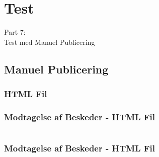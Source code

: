 \section{Test}
\begin{frame}
    \vspace{25mm}
    \begin{center}
        \Huge{Part 7:\\Test med Manuel Publicering}
    \end{center}
\end{frame}

\subsection{Manuel Publicering}
\subsubsection{HTML Fil}
\begin{frame}
    \frametitle{Modtagelse af Beskeder - HTML Fil}
    \vspace{-2mm}
    \inputminted[fontsize=\footnotesize,breaklines=true,highlightlines={}]{html}{../src/frontend/part7_publish/index.html}
\end{frame}
\begin{frame}
    \frametitle{Modtagelse af Beskeder - HTML Fil}
    \vspace{-2mm}
    \inputminted[fontsize=\footnotesize,breaklines=true,highlightlines={9,11,12}]{html}{../src/frontend/part7_publish/index.html}
\end{frame}

